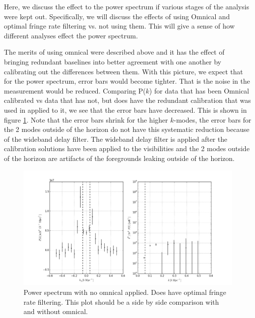 \documentclass[twocolumn,numberedappendix]{emulateapj} \shorttitle{PSA64}
\begin{document}
Here, we discuss the effect to the power spectrum if various stages of the
analysis were kept out. Specifically, we will discuss the effects of using
Omnical and optimal fringe rate filtering vs. not using them. This will give a
sense of how different analyses effect the power spectrum.

The merits of using omnical were described above and it has the effect of
bringing redundant baselines into better agreement with one another by
calibrating out the differences between them. With this picture, we expect
that for the power spectrum, error bars would become tighter. That is the
noise in the measurement would be reduced. Comparing P($k$) for data that has
been Omnical calibrated vs data that has not, but does have the redundant
calibration that was used in \cite{parsons_et_al2014a} applied to it, we see that
the error bars have decreased. This is shown in figure \ref{fig:pspec_nomni}.
Note that the error bars shrink for the higher $k$-modes, the error bars for the
2 modes outside of the horizon do not have this systematic reduction because of
the wideband delay filter. The wideband delay filter is applied after the
calibration solutions have been applied to the visibilities and the 2 modes
outside of the horizon are artifacts of the foregrounds leaking outside of the
horizon. 

\begin{figure}[t!]\centering
\includegraphics[width=\columnwidth]{plots/pk_k3pk_nomni.png}
\caption{Power spectrum with no omnical applied. Does have optimal fringe rate
        filtering. This plot should be a side by side comparison with and
        without omnical.}
\label{fig:pspec_nomni}
\end{figure}
\end{document}
